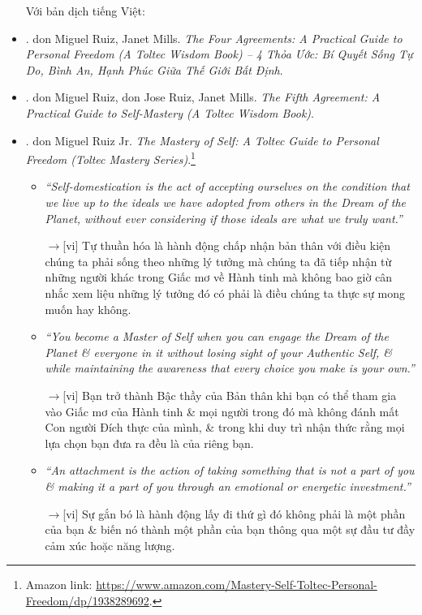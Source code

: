 \documentclass[12pt,twoside]{book}
\begin{document}
\begin{itemize}
	Với bản dịch tiếng Việt:
	\item \cite{Ruiz_Mills_4_agreements_VN}. {\sc don Miguel Ruiz, Janet Mills}. {\it The Four Agreements: A Practical Guide to Personal Freedom (A Toltec Wisdom Book) -- 4 Thỏa Ước: Bí Quyết Sống Tự Do, Bình An, Hạnh Phúc Giữa Thế Giới Bất Định}.
	\item \cite{Ruiz_Ruiz_5th_agreement}. {\sc don Miguel Ruiz, don Jose Ruiz, Janet Mills}. {\it The Fifth Agreement: A Practical Guide to Self-Mastery (A Toltec Wisdom Book)}.
	\item \cite{Ruiz_mastery_self}. {\sc don Miguel Ruiz Jr.} {\it The Mastery of Self: A Toltec Guide to Personal Freedom (Toltec Mastery Series)}.\footnote{Amazon link: \url{https://www.amazon.com/Mastery-Self-Toltec-Personal-Freedom/dp/1938289692}.}
	\begin{itemize}
		\item {\it``Self-domestication is the act of accepting ourselves on the condition that we live up to the ideals we have adopted from others in the Dream of the Planet, without ever considering if those ideals are what we truly want.''}
		
		{\sf[en]$\to$[vi]} Tự thuần hóa là hành động chấp nhận bản thân với điều kiện chúng ta phải sống theo những lý tưởng mà chúng ta đã tiếp nhận từ những người khác trong Giấc mơ về Hành tinh mà không bao giờ cân nhắc xem liệu những lý tưởng đó có phải là điều chúng ta thực sự mong muốn hay không.
				
		\item {\it``You become a Master of Self when you can engage the Dream of the Planet \& everyone in it without losing sight of your Authentic Self, \& while maintaining the awareness that every choice you make is your own.''}
		
		{\sf[en]$\to$[vi]} Bạn trở thành Bậc thầy của Bản thân khi bạn có thể tham gia vào Giấc mơ của Hành tinh \& mọi người trong đó mà không đánh mất Con người Đích thực của mình, \& trong khi duy trì nhận thức rằng mọi lựa chọn bạn đưa ra đều là của riêng bạn.
		
		\item {\it``An attachment is the action of taking something that is not a part of you \& making it a part of you through an emotional or energetic investment.''}
		
		{\sf[en]$\to$[vi]} Sự gắn bó là hành động lấy đi thứ gì đó không phải là một phần của bạn \& biến nó thành một phần của bạn thông qua một sự đầu tư đầy cảm xúc hoặc năng lượng.
		

\end{itemize}
\end{itemize}
\end{document}
